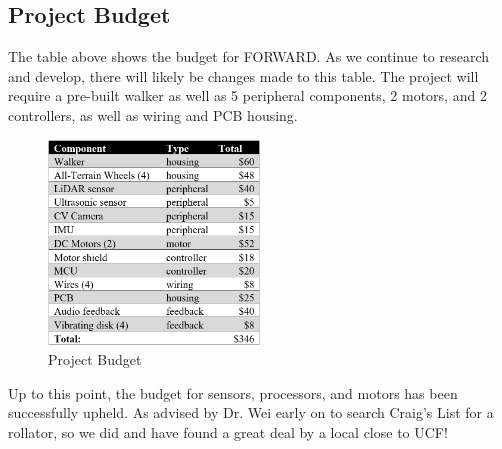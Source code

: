 \subsection{Project Budget} \label{sec:budget}
\noindent The table above shows the budget for FORWARD. As we continue to research and develop, there will likely be changes made to this table. The project will require a pre-built walker as well as 5 peripheral components, 2 motors, and 2 controllers, as well as wiring and PCB housing. \\

\begin{figure}[H]
	\centering
	\includegraphics[width=0.5\textwidth]{./Images/Budget.png}
	\caption{\label{fig:Budget}Project Budget}
\end{figure}

\noindent Up to this point, the budget for sensors, processors, and motors has been successfully upheld. As advised by Dr. Wei early on to search Craig's List for a rollator, so we did and have found a great deal by a local close to UCF!\\

